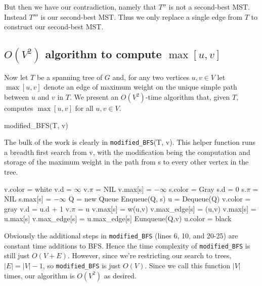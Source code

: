 \documentclass[paper=a4, fontsize=11pt]{scrartcl} %
\numberwithin{equation}{section} %
\numberwithin{figure}{section} %
\numberwithin{table}{section} %
\begin{document}
But then we have our contradiction, namely that $T''$ is not a second-best MST. Instead $T'''$ is our second-best MST. Thus we only replace a single edge from $T$ to construct our second-best MST.

\subsection{$O(V^2)$ algorithm to compute $\max [u,v]$}

Now let $T$ be a spanning tree of $G$ and, for any two vertices $u, v \in V$ let $\max[u, v]$ denote an edge of maximum weight on the unique simple path between $u$ and $v$ in $T$. We present an $O(V^2)$-time algorithm that, given $T$, computes $\max[u,v]$ for all $u, v \in V$. 

\begin{algorithmic}
		\State modified\_BFS(T, v)
	\EndFor
\EndFunction
\end{algorithmic}

The bulk of the work is clearly in \texttt{modified\_BFS}(T, v). This helper function runs a breadth first search from v, with the modification being the computation and storage of the maximum weight in the path from s to every other vertex in the tree.\\

\begin{algorithmic}[1]
		\State v.color = white
		\State v.d = $\infty$
		\State v.$\pi$ = NIL
		\State v.max[s] = $- \infty$ 
	\EndFor
	\State s.color = Gray
	\State s.d = 0
	\State s.$\pi$ = NIL
	\State s.max[s] = $- \infty$
	\State Q = new Queue
	\State Enqueue(Q, s)
		\State u = Dequeue(Q)
				\State v.color = gray
				\State v.d = u.d + 1
				\State v.$\pi$ = u
					\State v.max[s] = w(u,v)
					\State v.max\_edge[s] = (u,v)
				\Else
					\State v.max[s] = u.max[s]
					\State v.max\_edge[s] = u.max\_edge[s]
				\EndIf
				\State Eunqueue(Q,v)
			\EndIf
		\EndFor
		\State u.color = black
	\EndWhile
\EndFunction
\end{algorithmic}

Obviously the additional steps in \texttt{modified\_BFS} (lines 6, 10, and 20-25) are constant time additions to BFS. Hence the time complexity of \texttt{modified\_BFS} is still just $O(V + E)$. However, since we're restricting our search to trees, $|E| = |V| - 1$, so \texttt{modified\_BFS} is just $O(V)$. Since we call this function $|V|$ times, our algorithm is $O(V^2)$ as desired.
\end{document}
